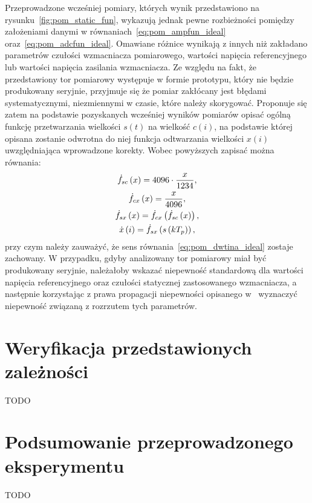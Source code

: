 Przeprowadzone wcześniej pomiary, których wynik przedstawiono na rysunku~\ref{fig:pom_static_fun}, wykazują jednak pewne rozbieżności pomiędzy założeniami danymi w równaniach~\eqref{eq:pom_ampfun_ideal} oraz~\eqref{eq:pom_adcfun_ideal}. Omawiane różnice wynikają z innych niż zakładano parametrów czułości wzmacniacza pomiarowego, wartości napięcia referencyjnego lub wartości napięcia zasilania wzmacniacza. Ze względu na fakt, że przedstawiony tor pomiarowy występuje w formie prototypu, który nie będzie produkowany seryjnie, przyjmuje się że pomiar zakłócany jest błędami systematycznymi, niezmiennymi w czasie, które należy skorygować. Proponuje się zatem na podstawie pozyskanych wcześniej wyników pomiarów opisać ogólną funkcję przetwarzania wielkości $s(t)$ na wielkość $c(i)$, na podstawie której opisana zostanie odwrotna do niej funkcja odtwarzania wielkości $x(i)$ uwzględniająca wprowadzone korekty. Wobec powyższych zapisać można równania:
\begin{gather}
\dot{f}_{sc} \left(x\right) = 4096 \cdot \frac{x}{1234} \label{eq:pom_scfun_ideal}, \\
\dot{f}_{cx} \left(x\right) = \frac{x}{4096} \label{eq:pom_cxfun_ideal}, \\
\dot{f}_{sx} \left(x\right) = \dot{f}_{cx} \left( \dot{f}_{sc} \left(x\right) \right) \label{eq:pom_sxfun_ideal}, \\
\dot{x} \left(i\right) = \dot{f}_{sx} \left( s \left(kT_{p}\right) \right) \label{eq:pom_dwtinb_ideal},
\end{gather}
przy czym należy zauważyć, że sens równania~\eqref{eq:pom_dwtina_ideal} zostaje zachowany. W przypadku, gdyby analizowany tor pomiarowy miał być produkowany seryjnie, należałoby wskazać niepewność standardową dla wartości napięcia referencyjnego oraz czułości statycznej zastosowanego wzmacniacza, a następnie korzystając z prawa propagacji niepewności opisanego w~\cite{jcgm_guide} wyznaczyć niepewność związaną z rozrzutem tych parametrów.



\section{Weryfikacja przedstawionych zależności}

TODO

\section{Podsumowanie przeprowadzonego eksperymentu}

TODO


